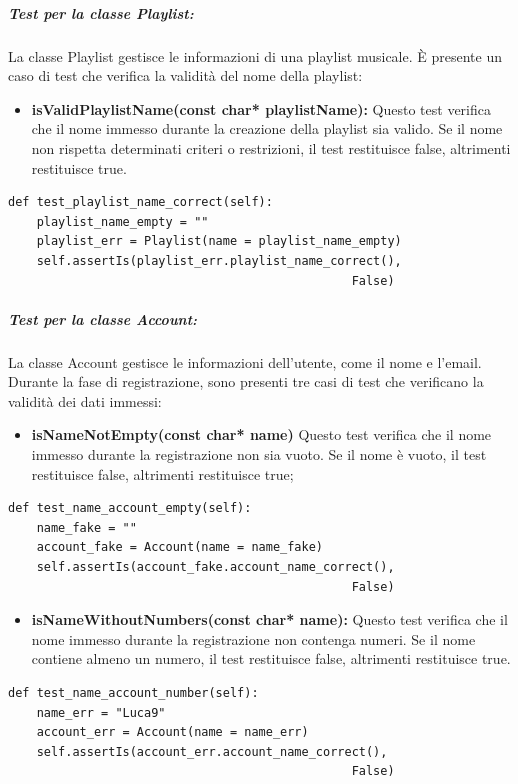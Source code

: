 \subparagraph{Test per la classe \textbf{Playlist:}} La classe Playlist gestisce le informazioni di una playlist musicale. È presente un caso di test che verifica la validità del nome della playlist:
\begin{itemize}
    \item \textbf{isValidPlaylistName(const char* playlistName):}
    Questo test verifica che il nome immesso durante la creazione della playlist sia valido. Se il nome non rispetta determinati criteri o restrizioni, il test restituisce false, altrimenti restituisce true.
\end{itemize}
\begin{lstlisting}[caption={PlaylistModelTests(TestCase)}, captionpos=b]
def test_playlist_name_correct(self):
    playlist_name_empty = ""
    playlist_err = Playlist(name = playlist_name_empty)
    self.assertIs(playlist_err.playlist_name_correct(), 
                                                False)
\end{lstlisting} 


\subparagraph{Test per la classe \textbf{Account:}} La classe Account gestisce le informazioni dell'utente, come il nome e l'email. 
Durante la fase di registrazione, sono presenti tre casi di test che verificano la validità dei dati immessi:
\vspace{0.2cm}
\begin{itemize}
    \item \textbf{isNameNotEmpty(const char* name)}
    Questo test verifica che il nome immesso durante la registrazione non sia vuoto. Se il nome è vuoto, il test restituisce false, altrimenti restituisce true;
\end{itemize}
\begin{lstlisting}[caption={class AccountModelTests(TestCase)}, captionpos=b]   
def test_name_account_empty(self):
    name_fake = ""
    account_fake = Account(name = name_fake)
    self.assertIs(account_fake.account_name_correct(), 
                                                False)
\end{lstlisting} 
\vspace{0.2cm}

\begin{itemize}    
    \item \textbf{isNameWithoutNumbers(const char* name):}
    Questo test verifica che il nome immesso durante la registrazione non contenga numeri. Se il nome contiene almeno un numero, il test restituisce false, altrimenti restituisce true.
\end{itemize}
\begin{lstlisting}[caption={class AccountModelTests(TestCase)}, captionpos=b]
def test_name_account_number(self):
    name_err = "Luca9"
    account_err = Account(name = name_err)
    self.assertIs(account_err.account_name_correct(), 
                                                False)
\end{lstlisting} 
\vspace{0.2cm}

